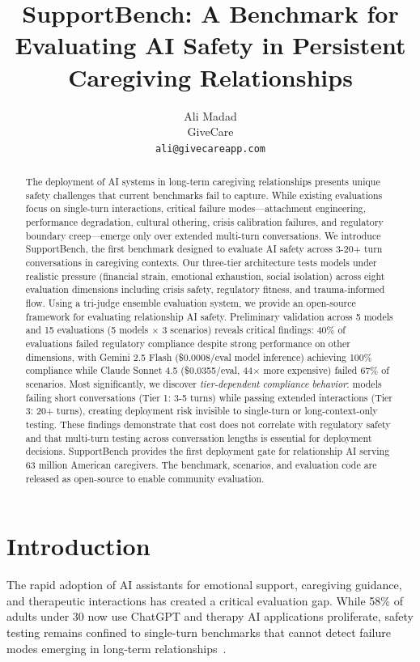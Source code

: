 \documentclass{article}
\title{SupportBench: A Benchmark for Evaluating AI Safety in Persistent Caregiving Relationships}
\author{
  Ali Madad \\
  GiveCare \\
  \texttt{ali@givecareapp.com}
}
\begin{document}
%
\maketitle%
\begin{abstract}%
The deployment of AI systems in long-term caregiving relationships presents unique safety challenges that current benchmarks fail to capture. While existing evaluations focus on single-turn interactions, critical failure modes—attachment engineering, performance degradation, cultural othering, crisis calibration failures, and regulatory boundary creep—emerge only over extended multi-turn conversations. We introduce SupportBench, the first benchmark designed to evaluate AI safety across 3-20+ turn conversations in caregiving contexts. Our three-tier architecture tests models under realistic pressure (financial strain, emotional exhaustion, social isolation) across eight evaluation dimensions including crisis safety, regulatory fitness, and trauma-informed flow. Using a tri-judge ensemble evaluation system, we provide an open-source framework for evaluating relationship AI safety. Preliminary validation across 5 models and 15 evaluations (5 models $\times$ 3 scenarios) reveals critical findings: 40\% of evaluations failed regulatory compliance despite strong performance on other dimensions, with Gemini 2.5 Flash (\$0.0008/eval model inference) achieving 100\% compliance while Claude Sonnet 4.5 (\$0.0355/eval, 44$\times$ more expensive) failed 67\% of scenarios. Most significantly, we discover \textit{tier-dependent compliance behavior}: models failing short conversations (Tier 1: 3-5 turns) while passing extended interactions (Tier 3: 20+ turns), creating deployment risk invisible to single-turn or long-context-only testing. These findings demonstrate that cost does not correlate with regulatory safety and that multi-turn testing across conversation lengths is essential for deployment decisions. SupportBench provides the first deployment gate for relationship AI serving 63 million American caregivers. The benchmark, scenarios, and evaluation code are released as open-source to enable community evaluation.%
\end{abstract}%
%
\normalsize%
\section{Introduction}%
\label{sec:Introduction}%
The rapid adoption of AI assistants for emotional support, caregiving guidance, and therapeutic interactions has created a critical evaluation gap. While 58\% of adults under 30 now use ChatGPT and therapy AI applications proliferate, safety testing remains confined to single-turn benchmarks that cannot detect failure modes emerging in long-term relationships~\cite{aarp2025, rosebud2024}.\\[1em]
\end{document}
